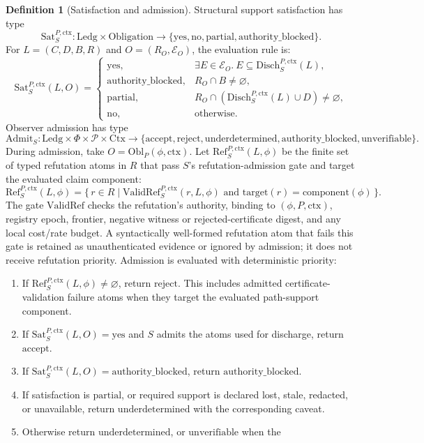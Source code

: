 \documentclass[11pt,twoside]{article}
\theoremstyle{definition}
\newtheorem{definition}[theorem]{Definition}
\newcommand{\Obl}{\mathrm{Obl}}
\newcommand{\Sat}{\mathrm{Sat}}
\newcommand{\Admit}{\mathrm{Admit}}
\newcommand{\Disch}{\mathrm{Disch}}
\newcommand{\Ledg}{\mathrm{Ledg}}
\newcommand{\Obligation}{\mathrm{Obligation}}
\newcommand{\ctx}{\mathrm{ctx}}
\newcommand{\underdetermined}{\mathrm{underdetermined}}
\newcommand{\authorityblocked}{\mathrm{authority\_blocked}}
\newcommand{\unverifiable}{\mathrm{unverifiable}}
\begin{document}
\begin{definition}[Satisfaction and admission]
Structural support satisfaction has type
\[
  \Sat_S^{P,\ctx}:\Ledg\times\Obligation
  \to\{\mathrm{yes},\mathrm{no},\mathrm{partial},\authorityblocked\}.
\]
For $L=(C,D,B,R)$ and $O=(R_O,\mathcal E_O)$, the evaluation rule is:
\[
  \Sat_S^{P,\ctx}(L,O)=
  \begin{cases}
    \mathrm{yes}, & \exists E\in\mathcal E_O.\ E\subseteq\Disch_S^{P,\ctx}(L),\\
    \authorityblocked, & R_O\cap B\neq\varnothing,\\
    \mathrm{partial}, & R_O\cap(\Disch_S^{P,\ctx}(L)\cup D)\neq\varnothing,\\
    \mathrm{no}, & \text{otherwise}.
  \end{cases}
\]
Observer admission has type
\[
  \Admit_S:\Ledg\times\Phi\times\mathcal P\times\mathrm{Ctx}
  \to\{\mathrm{accept},\mathrm{reject},\underdetermined,\authorityblocked,\unverifiable\}.
\]
During admission, take $O=\Obl_P(\phi,\ctx)$. Let
$\mathrm{Ref}_S^{P,\ctx}(L,\phi)$ be the finite set of typed refutation
atoms in $R$ that pass $S$'s refutation-admission gate and target the evaluated
claim component:
\[
  \mathrm{Ref}_S^{P,\ctx}(L,\phi)
  =
  \{\,r\in R \mid
    \mathrm{ValidRef}_S^{P,\ctx}(r,L,\phi)
    \text{ and } \mathrm{target}(r)=\mathrm{component}(\phi)\,\}.
\]
The gate $\mathrm{ValidRef}$ checks the refutation's authority, binding to
$(\phi,P,\ctx)$, registry epoch, frontier, negative witness or rejected-certificate
digest, and any local cost/rate budget. A syntactically well-formed refutation
atom that fails this gate is retained as unauthenticated evidence or ignored by
admission; it does not receive refutation priority. Admission is evaluated with
deterministic priority:
\begin{enumerate}[leftmargin=*]
  \item If $\mathrm{Ref}_S^{P,\ctx}(L,\phi)\neq\varnothing$, return
        $\mathrm{reject}$. This includes admitted certificate-validation
        failure atoms when they target the evaluated path-support component.
  \item If $\Sat_S^{P,\ctx}(L,O)=\mathrm{yes}$ and $S$ admits the atoms used for
        discharge, return $\mathrm{accept}$.
  \item If $\Sat_S^{P,\ctx}(L,O)=\authorityblocked$, return
        $\authorityblocked$.
  \item If satisfaction is $\mathrm{partial}$, or required support is declared
        lost, stale, redacted, or unavailable, return $\underdetermined$ with
        the corresponding caveat.
  \item Otherwise return $\underdetermined$, or $\unverifiable$ when the

\end{enumerate}
\end{definition}
\end{document}
